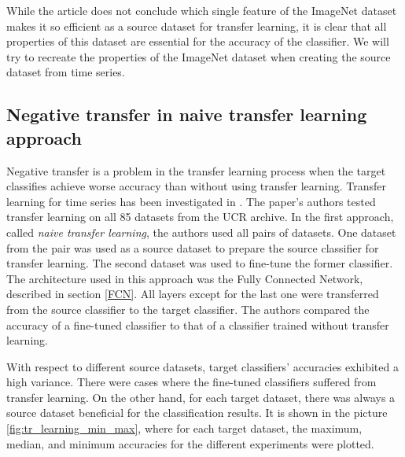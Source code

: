 \documentclass[a4paper,11pt,twoside]{report}
\theoremstyle{definition}
\begin{document}
While the article \cite{imagnet} does not conclude which single feature of the ImageNet dataset makes it so efficient as a source dataset for transfer learning, it is clear that all properties of this dataset are essential for the accuracy of the classifier. We will try to recreate the properties of the ImageNet dataset when creating the source dataset from time series.



\subsection{Negative transfer in naive transfer learning approach}\label{Negative_transfer}
Negative transfer is a problem in the transfer learning process when the target classifies achieve worse accuracy than without using transfer learning. Transfer learning for time series has been investigated in \cite{transfer_learning_time_series}. The paper's authors tested transfer learning on all 85 datasets from the UCR archive. In the first approach, called \textit{naive transfer learning}, the authors used all pairs of datasets. One dataset from the pair was used as a source dataset to prepare the source classifier for transfer learning. The second dataset was used to fine-tune the former classifier. The architecture used in this approach was the Fully Connected Network, described in section \ref{FCN}.  All layers except for the last one were transferred from the source classifier to the target classifier. The authors compared the accuracy of a fine-tuned classifier to that of a classifier trained without transfer learning.

With respect to different source datasets, target classifiers' accuracies exhibited a high variance. There were cases where the fine-tuned classifiers suffered from transfer learning. On the other hand, for each target dataset, there was always a source dataset beneficial for the classification results. It is shown in the picture \ref{fig:tr_learning_min_max}, where for each target dataset, the maximum, median, and minimum accuracies for the different experiments were plotted.

\FloatBarrier
\end{document}
